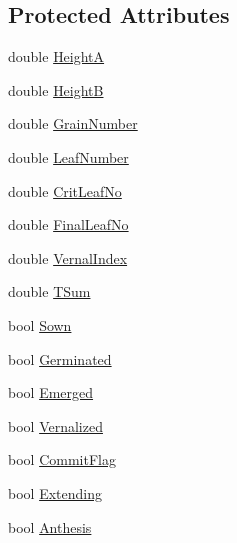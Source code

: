 \subsection*{Protected Attributes}
\begin{DoxyCompactItemize}
\item 
double \hyperlink{classcrop_wwheat_a0c7c6fd6130f3e2d674425e197b89c18}{HeightA}
\item 
double \hyperlink{classcrop_wwheat_aef2d9cfa48e1900ebe12ea941d9a5c29}{HeightB}
\item 
double \hyperlink{classcrop_wwheat_a7276dce5dce60718bc86927cd07c1d37}{GrainNumber}
\item 
double \hyperlink{classcrop_wwheat_a9a61a270f58f56b99415565bacbc7593}{LeafNumber}
\item 
double \hyperlink{classcrop_wwheat_a70dc1057062a1f5253c85489f8e81b8c}{CritLeafNo}
\item 
double \hyperlink{classcrop_wwheat_a98060c396ec2acda253f4ced16e5a420}{FinalLeafNo}
\item 
double \hyperlink{classcrop_wwheat_aab8c0008d737c8d956fb6aae9e4836cf}{VernalIndex}
\item 
double \hyperlink{classcrop_wwheat_a344306614fe2a9d6eca60d40495f75f5}{TSum}
\item 
bool \hyperlink{classcrop_wwheat_a08798879fdcd00a5dbbfa8307d58ed16}{Sown}
\item 
bool \hyperlink{classcrop_wwheat_a62c768b4065c4f279fa457ca821f6288}{Germinated}
\item 
bool \hyperlink{classcrop_wwheat_a20586dec607d8ba2aad31484c111a7d0}{Emerged}
\item 
bool \hyperlink{classcrop_wwheat_a5b0ae3b52fec5932b9ca55964db35af4}{Vernalized}
\item 
bool \hyperlink{classcrop_wwheat_ae8060d1a4163cc8244cc5777d5c8f3ec}{CommitFlag}
\item 
bool \hyperlink{classcrop_wwheat_ae8abed987e9a9d614c805b4ca94aeb7b}{Extending}
\item 
bool \hyperlink{classcrop_wwheat_aa7ae2a24c245254748efd6393dc6995f}{Anthesis}
\end{DoxyCompactItemize}


